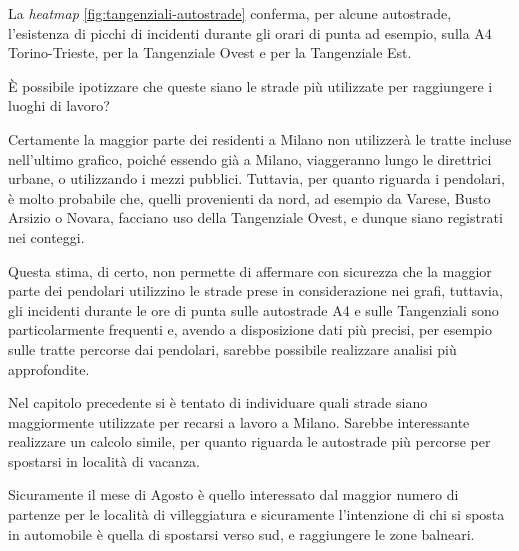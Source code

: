\documentclass[a4paper]{report}
\newcommand{\quotestyle}[1]{\textit{#1}}
\begin{document}
La \quotestyle{heatmap} \ref{fig:tangenziali-autostrade} conferma, per alcune autostrade, 
l'esistenza di picchi di incidenti durante gli orari di punta ad esempio, 
sulla A4 Torino-Trieste, 
per la Tangenziale Ovest e per la Tangenziale Est. 

\`E possibile ipotizzare che queste siano le strade più utilizzate per 
raggiungere i luoghi di lavoro? 

Certamente la maggior parte dei residenti a Milano non utilizzerà le tratte incluse 
nell'ultimo grafico, poiché essendo già a Milano, 
viaggeranno lungo le direttrici urbane, o utilizzando i mezzi pubblici. 
Tuttavia, per quanto riguarda i pendolari, è molto probabile che, quelli provenienti 
da nord, ad esempio da Varese, Busto Arsizio o Novara, 
facciano uso della Tangenziale Ovest, 
e dunque siano registrati nei conteggi. 

Questa stima, di certo, non permette di affermare con sicurezza 
che la maggior parte dei pendolari utilizzino le strade prese in considerazione 
nei grafi, 
tuttavia, gli incidenti durante le ore di punta sulle autostrade A4 e sulle 
Tangenziali sono particolarmente frequenti e, avendo a disposizione dati più 
precisi, per esempio sulle tratte percorse dai pendolari, sarebbe possibile 
realizzare analisi più approfondite. 




Nel capitolo precedente si è tentato di individuare quali strade siano maggiormente 
utilizzate per recarsi a lavoro a Milano. 
Sarebbe interessante realizzare un calcolo simile, per quanto riguarda le autostrade 
più percorse per spostarsi in località di vacanza. 

Sicuramente il mese di Agosto è quello interessato dal maggior numero 
di partenze per le località di villeggiatura e sicuramente l'intenzione 
di chi si sposta in automobile è quella di spostarsi verso sud, 
e raggiungere le zone balneari. 
\end{document}
